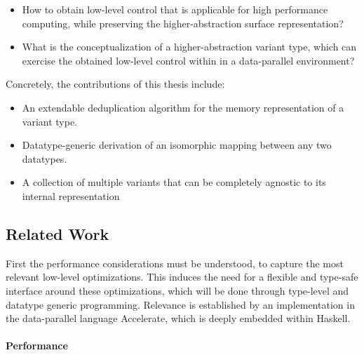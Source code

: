 \documentclass{article}
\begin{document}
\begin{itemize}
    \item How to obtain low-level control that is applicable for high performance computing, while preserving the higher-abstraction surface representation?
    \item What is the conceptualization of a higher-abstraction variant type, which can exercise the obtained low-level control within in a data-parallel environment?
\end{itemize}

\noindent
Concretely, the contributions of this thesis include: 

\begin{itemize}
    \item An extendable deduplication algorithm for the memory representation of a variant type.
    \item Datatype-generic derivation of an isomorphic mapping between any two datatypes.
    \item A collection of multiple variants that can be completely agnostic to its internal representation
\end{itemize}

\subsection{Related Work}

First the performance considerations must be understood, to capture the most relevant low-level optimizations.
This induces the need for a flexible and type-safe interface around these optimizations, which will be done through type-level and datatype generic programming.
Relevance is established by an implementation in the data-parallel language Accelerate, which is deeply embedded within Haskell.

\paragraph{Performance}
\end{document}
